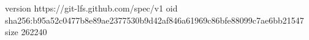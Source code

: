 version https://git-lfs.github.com/spec/v1
oid sha256:b95a52c0477b8e89ae2377530b9d42af846a61969c86bfe88099c7ae6bb21547
size 262240
